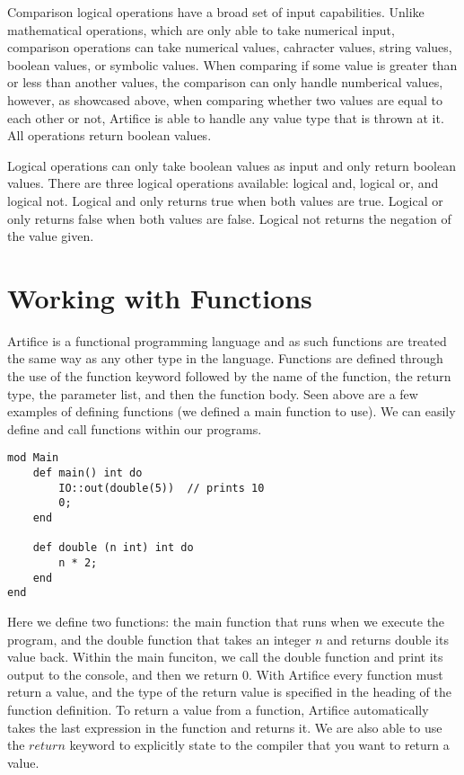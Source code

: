 \documentclass{article}
\begin{document}
Comparison logical operations have a broad set of input capabilities. Unlike mathematical operations, which are only able to take numerical input,
comparison operations can take numerical values, cahracter values, string values, boolean values, or symbolic values. When comparing if some value is
greater than or less than another values, the comparison can only handle numberical values, however, as showcased above, when comparing whether two
values are equal to each other or not, Artifice is able to handle any value type that is thrown at it. All operations return boolean values.

Logical operations can only take boolean values as input and only return boolean values. There are three logical operations available: logical and,
logical or, and logical not. Logical and only returns true when both values are true. Logical or only returns false when both values are false.
Logical not returns the negation of the value given.


\section{Working with Functions}

Artifice is a functional programming language and as such functions are treated the same way as any other type in the language. Functions are defined through
the use of the function keyword followed by the name of the function, the return type, the parameter list, and then the function body. Seen above are a few
examples of defining functions (we defined a main function to use). We can easily define and call functions within our programs.

\begin{lstlisting}
mod Main
	def main() int do
		IO::out(double(5))  // prints 10
		0;
	end

	def double (n int) int do
		n * 2;
	end
end
\end{lstlisting}

Here we define two functions: the main function that runs when we execute the program, and the double function that takes an integer $n$ and returns
double its value back. Within the main funciton, we call the double function and print its output to the console, and then we return $0$. With Artifice
every function must return a value, and the type of the return value is specified in the heading of the function definition. To return a value from
a function, Artifice automatically takes the last expression in the function and returns it. We are also able to use the $return$ keyword to explicitly
state to the compiler that you want to return a value.
\end{document}
